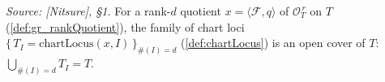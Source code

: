 \begin{lemma}
  \label{lem:chartLocus_isOpenCover}
  \textit{Source: [Nitsure], \S 1.}
  For a rank-\(d\) quotient \(x = \langle \mathcal{F}, q\rangle\) of \(\mathcal{O}_T^{\,r}\)
  on \(T\) (\cref{def:gr_rankQuotient}), the family of chart loci
  \(\{\,T_I = \mathrm{chartLocus}(x, I)\,\}_{\#(I) = d}\) (\cref{def:chartLocus}) is an open
  cover of \(T\): \(\bigcup_{\#(I)=d} T_I = T\).
\end{lemma}

